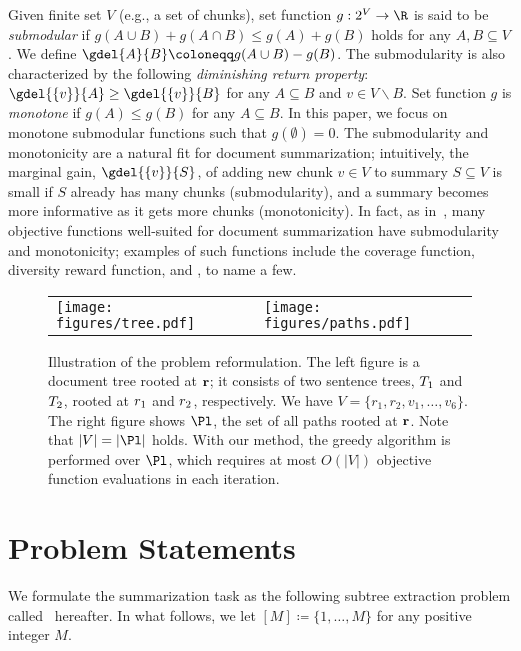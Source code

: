 \documentclass[11pt,a4paper]{article}
\begin{document}
	Given finite set $V$ (e.g., a set of chunks), 
	set function $g:2^V\to\R$ is said to be {\it submodular} 
	if $g(A\cup B)+g(A\cap B)\le g(A)+g(B)$ 
	holds for any $A,B\subseteq V$.  
	We define $\gdel{A}{B}\coloneqq g(A\cup B)-g(B)$.  
	The submodularity is also characterized by the following {\it diminishing return property}: 
	$\gdel{\{v\}}{A}\ge\gdel{\{v\}}{B}$ for any $A\subseteq B$ and $v\in V\backslash B$. 
	Set function $g$ is {\it monotone} if $g(A)\le g(B)$ for any $A\subseteq B$. 
	In this paper, we focus on monotone submodular functions such that $g(\emptyset)=0$. 
	The submodularity and monotonicity are a natural fit for document summarization;  
	intuitively, 
	the marginal gain, $\gdel{\{ v \}}{S}$, 
	of adding new chunk $v\in V$ to summary $S\subseteq V$ 
	is small if $S$ already has many chunks (submodularity), 
	and a summary becomes more informative as it gets more chunks (monotonicity).  
	In fact,  
	as in~\cite{lin2011class}, 
	many objective functions well-suited for document summarization 
	have submodularity and monotonicity; 
	examples of such functions include 
	the {coverage function}, {diversity reward function}, and \rouge, 
	to name a few. 
	
	
	\begin{figure*}[htb]
		\centering
		\begin{tabular}{p{}p{}}
			\centering
			\texttt{[image: figures/tree.pdf]}
			\caption*{(a) Document tree $\Td=(\{ \rd \}\cup V, E)$}
			\label{fig:tree}
			&
			\centering
			\texttt{[image: figures/paths.pdf]}
			\caption*{(b) Set of all paths rooted at $\rd$}
			\label{fig:paths}
		\end{tabular}
		\caption{
			Illustration of the problem reformulation. 
			The left figure is a document tree 
			rooted at $\rd$;  
			it consists of two sentence trees, 
			${T}_1$ and ${T}_2$, 
			rooted at $r_1$ and $r_2$, respectively.  
			We have $V=\{r_1,r_2,v_1,\dots,v_6 \}$. 
			The right figure shows $\Pl$, 
			the set of all paths rooted at $\rd$. 
			Note that $|V|=|\Pl|$ holds.  
			With our method, the greedy algorithm is 
			performed over $\Pl$, 
			which requires at most $O(|V|)$  
			objective function evaluations in each iteration. 
		}
		\label{fig:reformulation}
	\end{figure*}
	
	\section{Problem Statements}\label{section:problem}
	We 
	formulate the summarization task as  the following subtree extraction problem called \stkp\ hereafter. 
	In what follows, 
	we let $[M]\coloneqq \{ 1,\dots,M \}$ for any positive integer $M$. 
	
\end{document}
